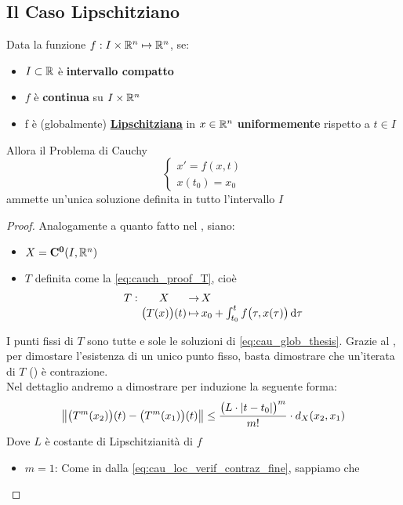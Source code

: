 \subsection{Il Caso Lipschitziano}
\begin{theorem}
	\label{teo:cau_glob_lips}
	Data la funzione $f:I \times \mathbb{R}^n \mapsto \mathbb{R}^n$, se:
	\begin{itemize}
		\item $I \subset \mathbb{R}$ è \textbf{intervallo compatto}
		\item $f$ è \textbf{continua} su $I \times \mathbb{R}^n$
		\item f è (globalmente) \hyperref[def:lips]{\textbf{Lipschitziana}} in $x \in \mathbb{R}^n$ \textbf{uniformemente} rispetto a $t \in I$
	\end{itemize}
	Allora il Problema di Cauchy
	\begin{equation}
		\label{eq:cau_glob_thesis}
		\begin{cases}
			x' = f(x,t)\\
			x(t_0) = x_0
		\end{cases}
	\end{equation}
	ammette un'unica soluzione definita in tutto l'intervallo $I$
	\begin{proof}
		Analogamente a quanto fatto nel , siano:
		\begin{itemize}
			\item $X = \mathbf{C^{0}}(I,\mathbb{R}^n)$
			\item $T$ definita come la \cref{eq:cauch_proof_T}, cioè
				$$\funcdef{\textrm{$T$}}{\bigl(T(x)\bigr)(t)}{X}[x_0+\int_{t_0}^tf\bigl(\tau,x(\tau)\bigr)\integrald{\tau}]$$
		\end{itemize}
		I punti fissi di $T$ sono tutte e sole le soluzioni di \cref{eq:cau_glob_thesis}. Grazie al , per dimostare l'esistenza di un unico punto fisso, basta dimostrare che un'iterata di $T$ () è contrazione.\\
		Nel dettaglio andremo a dimostrare per induzione la seguente forma:
		\begin{equation}
			\left\|\bigl(T^m(x_2)\bigr)(t) - \bigl(T^m(x_1)\bigr)(t)\right\| \leq \frac{\bigl(L \cdot \left|t-t_0\right|\bigr)^m}{m!} \cdot d_X(x_2,x_1)
		\end{equation}
		Dove $L$ è costante di Lipschitzianità di $f$\\
		\begin{itemize}
			\item $m=1$: Come in dalla \cref{eq:cau_loc_verif_contraz_fine}, sappiamo che

\end{itemize}
\end{proof}
\end{theorem}
